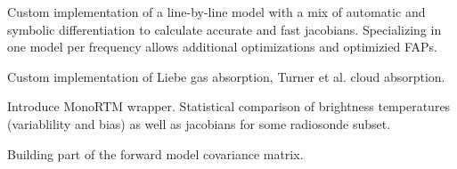 \startsection[title=A Numerical Model]

    Custom implementation of a line-by-line model with a mix of automatic and
    symbolic differentiation to calculate accurate and fast jacobians.
    Specializing in one model per frequency allows additional optimizations
    and optimizied FAPs.

    \startsubsection[title=Implementation]

        Custom implementation of Liebe gas absorption, Turner et al. cloud
        absorption.

    \stopsubsection

    \startsubsection[title=Comparison with MonoRTM]

        Introduce MonoRTM wrapper. Statistical comparison of brightness
        temperatures (variablility and bias) as well as jacobians for some
        radiosonde subset.

    \stopsubsection

    \startsubsection[title={Characterizing Errors},reference={ch:rtm_errors}]

        Building part of the forward model covariance matrix.

    \stopsubsection

\stopsection


